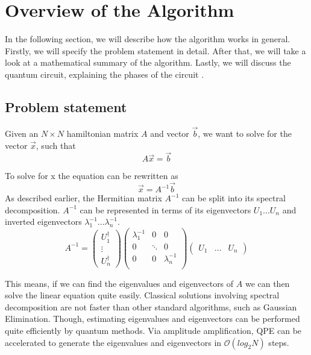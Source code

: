 \section{ Overview of the Algorithm}
In the following section, we will describe how the algorithm works in general.
Firstly, we will specify the problem statement in detail.
After that, we will take a look at a mathematical summary of the algorithm. 
Lastly, we will discuss the quantum circuit, explaining the phases of the circuit \cite{qiskit_hhl}\cite{primer}.

\subsection{Problem statement}

Given an $N\times N$ hamiltonian matrix $A$ and vector $\vec b$, we want to solve for the vector $\vec x$, such that
\begin{equation}
A \vec{x} = \vec{b}
\end{equation}

To solve for x the equation can be rewritten as
\begin{equation}
\vec{x} = A^{-1}\vec{b}
\end{equation}
As described earlier, the Hermitian matrix $A^{-1}$ can be split into its spectral decomposition. 
$A^{-1}$ can be represented in terms of its eigenvectors $U_1 ... U_n$ and inverted eigenvectors $\lambda_1^{-1 } ... \lambda_n^{-1}$.
\begin{equation} 
 A^{-1} = \begin{pmatrix} U^\dagger_1 \\ \vdots \\ U^\dagger_n \end{pmatrix}
\begin{pmatrix} \lambda_1^{-1} & 0 & 0\\ 0 & \ddots & 0\\ 0 & 0& \lambda_n^{-1} \\ \end{pmatrix}
\begin{pmatrix} U_1 & \dots & U_n \end{pmatrix} 
\end{equation}

This means, if we can find the eigenvalues and eigenvectors of $A$ we can then solve the linear equation quite easily. 
Classical solutions involving spectral decomposition are not faster than other standard algorithms, such as Gaussian Elimination. 
Though, estimating eigenvalues and eigenvectors can be performed quite efficiently by quantum methods.
Via amplitude amplification, QPE can be accelerated to generate the eigenvalues and eigenvectors in $\mathcal{O}(log_2 N)$ steps.

